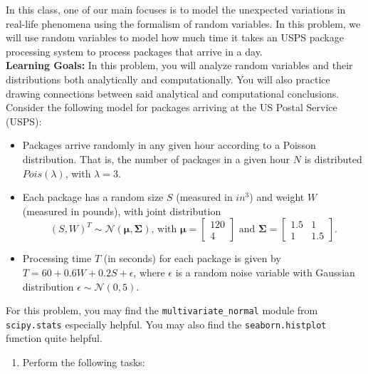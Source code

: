 \documentclass{harvardml}
\theoremstyle{definition}
\theoremstyle{plain}
\begin{document}
\pagebreak
\begin{problem}
In this class, one of our main focuses is to model the unexpected variations in real-life phenomena using the formalism of random variables. In this problem, we will use random variables to model how much time it takes an USPS package processing system to process packages that arrive in a day.\\

\noindent \textbf{Learning Goals:} In this problem, you will analyze random variables and their distributions both analytically and computationally. You will also practice drawing connections between said analytical and computational conclusions.\\

\noindent Consider the following model for packages arriving at the US Postal Service (USPS):
\begin{itemize}                            
    \item Packages arrive randomly in any given hour according to a Poisson distribution. That is, the number of packages in a given hour $N$ is distributed $Pois(\lambda)$, with $\lambda = 3$.
    \item Each package has a random size $S$ (measured in $in^3$) and weight $W$ (measured in pounds), with joint distribution
    $$(S, W)^{T} \sim \mathcal{N}\left( \boldsymbol{\mu}, \boldsymbol{\Sigma}\right) \text{, with } \boldsymbol{\mu} = \begin{bmatrix} 120 \\ 4 \end{bmatrix} \text{ and } \boldsymbol{\Sigma} = \begin{bmatrix} 1.5 & 1 \\ 1 & 1.5 \end{bmatrix}.$$
    \item Processing time $T$ (in seconds) for each package is given by $T = 60 + 0.6 W + 0.2 S + \epsilon$, where $\epsilon$ is a random noise variable with Gaussian distribution $\epsilon \sim \mathcal{N}(0, 5)$.
\end{itemize}
For this problem, you may find the \texttt{multivariate\_normal} module from \texttt{scipy.stats} especially helpful. You may also find the \texttt{seaborn.histplot} function quite helpful. 
\begin{enumerate}
    \item Perform the following tasks:
    \begin{enumerate}

\end{enumerate}
\end{enumerate}
\end{problem}
\end{document}
